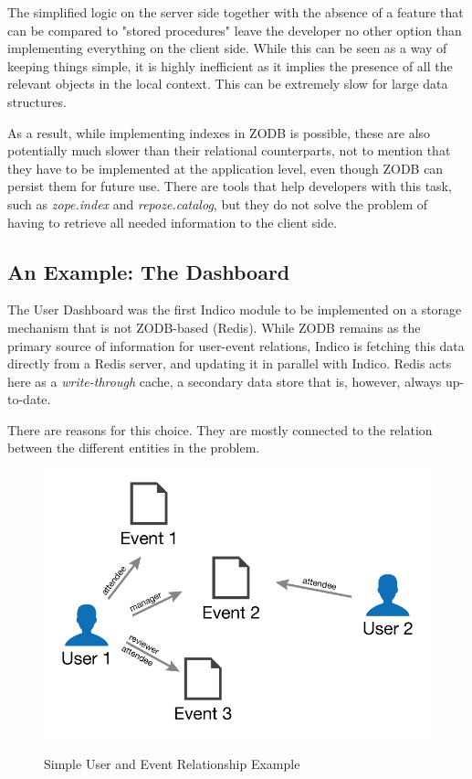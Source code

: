 The simplified logic on the server side together with the absence of a feature that can be compared to "stored procedures" leave the developer no other option than implementing everything on the client side. While this can be seen as a way of keeping things simple, it is highly inefficient as it implies the presence of all the relevant objects in the local context. This can be extremely slow for large data structures.

As a result, while implementing indexes in \textsc{ZODB} is possible, these are also potentially much slower than their relational counterparts, not to mention that they have to be implemented at the application level, even though ZODB can persist them for future use. There are tools that help developers with this task, such as \textit{zope.index} and \textit{repoze.catalog}, but they do not solve the problem of having to retrieve all needed information to the client side.

\subsection{An Example: The Dashboard}
 
The User Dashboard was the first Indico module to be implemented on a storage mechanism that is not ZODB-based (Redis). While ZODB remains as the primary source of information for user-event relations, Indico is fetching this data directly from a Redis server, and updating it in parallel with Indico. Redis acts here as a \textit{write-through} cache, a secondary data store that is, however, always up-to-date.

There are reasons for this choice. They are mostly connected to the relation between the different entities in the problem.

\begin{figure}[H]
  \caption{Simple User and Event Relationship Example}
  \centering
    \includegraphics[scale=4]{2/figures/dashboard.png}
  \label{dash}
\end{figure}


